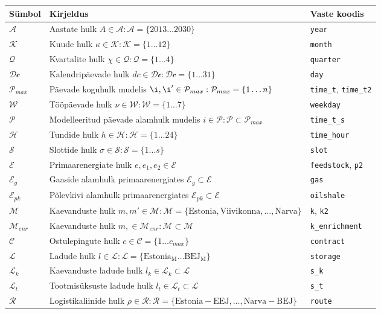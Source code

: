 \begin{table}
\begin{tabular}{l l l}
Sümbol & Kirjeldus & Vaste koodis\\
\hline
$\mathcal{A}$ & Aastate hulk $A \in \mathcal{A}: \mathcal{A}=\{2013\dots 2030\}$ & \texttt{year} \\
$\mathcal{K}$ & Kuude hulk $\kappa \in \mathcal{K}: \mathcal{K} = \{1\dots 12\}$ & \texttt{month} \\
$\mathcal{Q}$ & Kvartalite hulk $\chi \in \mathcal{Q}: \mathcal{Q} = \{1\dots 4\}$ & \texttt{quarter}\\
$\mathcal{Dc}$ & Kalendripäevade hulk $dc \in \mathcal{Dc}: \mathcal{Dc} = \{1\dots 31\}$ & \texttt{day}\\
$\mathcal{P}_{max}$ & Päevade koguhulk mudelis $\i,\i' \in \mathcal{P}_{max} : \mathcal{P}_{max} = \{1\dots n\}$ & \texttt{time\_t}, \texttt{time\_t2}\\
$\mathcal{W}$ & Tööpäevade hulk $\nu \in \mathcal{W}: \mathcal{W} = \{1\dots 7\}$ & \texttt{weekday}\\
$\mathcal{P}$ & Modelleeritud päevade alamhulk mudelis $i \in \mathcal{P}: \mathcal{P} \subset \mathcal{P}_{max}$ & \texttt{time\_t\_s}\\
$\mathcal{H}$ & Tundide hulk $h \in \mathcal{H}: \mathcal{H} = \{1\dots 24\}$  & \texttt{time\_hour}\\
$\mathcal{S}$ & Slottide hulk $\sigma \in \mathcal{S}: \mathcal{S} = \{1\dots s\}$ & \texttt{slot}\\

$\mathcal{E}$      & Primaarenergiate hulk $e,e_1,e_2 \in \mathcal{E}$ & \texttt{feedstock}, \texttt{p2}\\
$\mathcal{E}_g$    & Gaaside alamhulk primaarenergiates $\mathcal{E}_g \subset \mathcal{E}$ & \texttt{gas} \\
$\mathcal{E}_{pk}$ & Põlevkivi alamhulk primaarenergiates $\mathcal{E}_{pk} \subset \mathcal{E}$ & \texttt{oilshale} \\

$\mathcal{M} $  & Kaevanduste hulk $m, m' \in \mathcal{M}:\mathcal{M}=\{\mathrm{Estonia, Viivikonna,}\dots \mathrm{,Narva}\}$ & \texttt{k}, \texttt{k2}\\
$\mathcal{M}_{enr}$  & Kaevanduste hulk $m, \in \mathcal{M}_{enr}:\mathcal{M}\subset \mathcal{M}$ & \texttt{k\_enrichment}\\
$\mathcal{C}$   & Ostulepingute hulk $c \in \mathcal{C} = \{1\dots c_{max}\}$ & \texttt{contract} \\
$\mathcal{L}$   & Ladude hulk $l \in \mathcal{L}:\mathcal{L}=\{\mathrm{Estonia_M}\dots\mathrm{BEJ_M}\}$ & \texttt{storage}\\
$\mathcal{L}_k$ & Kaevanduste ladude hulk $l_k \in \mathcal{L}_k \subset \mathcal{L}$ & \texttt{s\_k} \\
$\mathcal{L}_t$ & Tootmisüksuste ladude hulk $l_t \in \mathcal{L}_t \subset \mathcal{L}$ & \texttt{s\_t} \\
$\mathcal{R}$   & Logistikaliinide hulk $\rho \in \mathcal{R}:\mathcal{R}=\{\mathrm{Estonia-EEJ},\dots ,\mathrm{Narva-BEJ}\}$ & \texttt{route}\\


\end{tabular}
\end{table}
